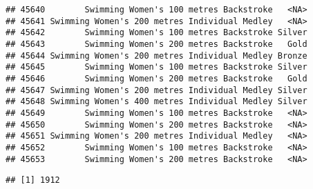 \documentclass[
]{article}
\newenvironment{Shaded}{\begin{snugshade}}{\end{snugshade}}
\newcommand{\AttributeTok}[1]{\textcolor[rgb]{0.77,0.63,0.00}{#1}}
\newcommand{\CommentTok}[1]{\textcolor[rgb]{0.56,0.35,0.01}{\textit{#1}}}
\newcommand{\DecValTok}[1]{\textcolor[rgb]{0.00,0.00,0.81}{#1}}
\newcommand{\FunctionTok}[1]{\textcolor[rgb]{0.00,0.00,0.00}{#1}}
\newcommand{\NormalTok}[1]{#1}
\newcommand{\OtherTok}[1]{\textcolor[rgb]{0.56,0.35,0.01}{#1}}
\newcommand{\SpecialCharTok}[1]{\textcolor[rgb]{0.00,0.00,0.00}{#1}}
\newcommand{\StringTok}[1]{\textcolor[rgb]{0.31,0.60,0.02}{#1}}
\begin{document}
\begin{verbatim}
## 45640        Swimming Women's 100 metres Backstroke   <NA>
## 45641 Swimming Women's 200 metres Individual Medley   <NA>
## 45642        Swimming Women's 100 metres Backstroke Silver
## 45643        Swimming Women's 200 metres Backstroke   Gold
## 45644 Swimming Women's 200 metres Individual Medley Bronze
## 45645        Swimming Women's 100 metres Backstroke Silver
## 45646        Swimming Women's 200 metres Backstroke   Gold
## 45647 Swimming Women's 200 metres Individual Medley Silver
## 45648 Swimming Women's 400 metres Individual Medley Silver
## 45649        Swimming Women's 100 metres Backstroke   <NA>
## 45650        Swimming Women's 200 metres Backstroke   <NA>
## 45651 Swimming Women's 200 metres Individual Medley   <NA>
## 45652        Swimming Women's 100 metres Backstroke   <NA>
## 45653        Swimming Women's 200 metres Backstroke   <NA>
\end{verbatim}

\begin{Shaded}
\end{Shaded}

\begin{verbatim}
## [1] 1912
\end{verbatim}

\begin{Shaded}
\end{Shaded}
\end{document}
